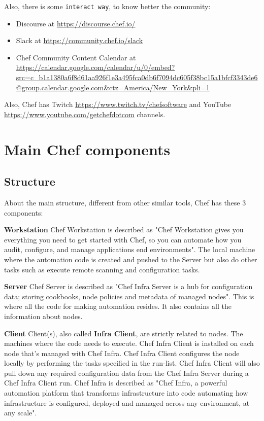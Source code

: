 \documentclass[12pt,a4paper,openright,twoside]{book}
\begin{document}
Also, there is some \texttt{interact way}, to know better the community:

\begin{itemize}
    \item Discourse at \url{https://discourse.chef.io/}
    \item Slack at \url{https://community.chef.io/slack}
    \item Chef Community Content Calendar at \url{https://calendar.google.com/calendar/u/0/embed?src=c_b1a1380a6f8d61aa926f1e3a495fca0db6f7094dc605f38bc15a1bfcf3343de6@group.calendar.google.com&ctz=America/New_York&pli=1}
\end{itemize}

Also, Chef has Twitch \url{https://www.twitch.tv/chefsoftware} and YouTube \url{https://www.youtube.com/getchefdotcom} channels.

\section{Main Chef components}

\subsection{Structure}
About the main structure, different from other similar tools, Chef has these 3 components:


\textbf{Workstation}
Chef Workstation is described as\cite{chefWorkstation}
"Chef Workstation gives you everything you need to get started with Chef, so you can automate how you audit, configure, and manage applications end environments".
The local machine where the automation code is created and pushed to the Server but also do other tasks such as execute remote scanning and configuration tasks.


\textbf{Server}
Chef Server is described as\cite{chefServer}
"Chef Infra Server is a hub for configuration data; storing cookbooks, node policies and metadata of managed nodes".
This is where all the code for making automation resides. It also contains all the information about nodes.


\textbf{Client}
Client(s), also called \textbf{Infra Client}, are strictly related to nodes. The machines where the code needs to execute.
Chef Infra Client is installed on each node that's managed with Chef Infra. Chef Infra Client configures the node locally by performing the tasks specified in the run-list.
Chef Infra Client will also pull down any required configuration data from the Chef Infra Server during a Chef Infra Client run.
Chef Infra is described as\cite{chefInfra}
"Chef Infra, a powerful automation platform that transforms infrastructure into code automating how infrastructure is configured, deployed and managed across any environment, at any scale".
\end{document}

